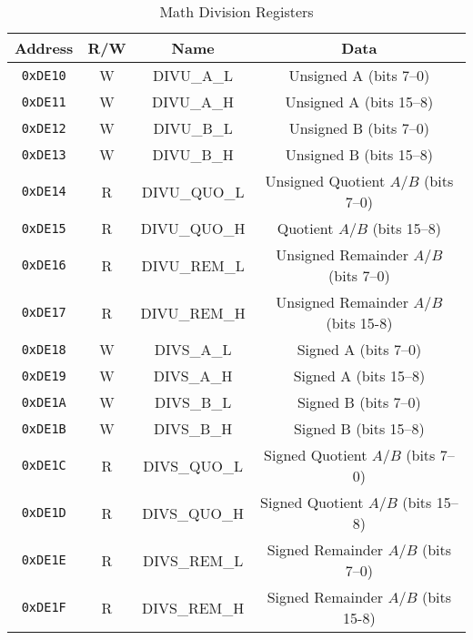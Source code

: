 \begin{table}[ht]
    \begin{center}
        \begin{tabular}{|c|c|c|c|} \hline
            Address & R/W & Name & Data \\\hline\hline
            \verb+0xDE10+ & W & DIVU\_A\_L & Unsigned A (bits 7--0) \\ \hline
            \verb+0xDE11+ & W & DIVU\_A\_H & Unsigned A (bits 15--8) \\ \hline
            \verb+0xDE12+ & W & DIVU\_B\_L & Unsigned B (bits 7--0) \\ \hline
            \verb+0xDE13+ & W & DIVU\_B\_H & Unsigned B (bits 15--8) \\ \hline
            \verb+0xDE14+ & R & DIVU\_QUO\_L & Unsigned Quotient $A / B$ (bits 7--0) \\ \hline
            \verb+0xDE15+ & R & DIVU\_QUO\_H & Quotient $A / B$ (bits 15--8) \\ \hline
            \verb+0xDE16+ & R & DIVU\_REM\_L & Unsigned Remainder $A / B$ (bits 7--0) \\ \hline
            \verb+0xDE17+ & R & DIVU\_REM\_H & Unsigned Remainder $A / B$ (bits 15-8) \\ \hline\hline

            \verb+0xDE18+ & W & DIVS\_A\_L & Signed A (bits 7--0) \\ \hline
            \verb+0xDE19+ & W & DIVS\_A\_H & Signed A (bits 15--8) \\ \hline
            \verb+0xDE1A+ & W & DIVS\_B\_L & Signed B (bits 7--0) \\ \hline
            \verb+0xDE1B+ & W & DIVS\_B\_H & Signed B (bits 15--8) \\ \hline
            \verb+0xDE1C+ & R & DIVS\_QUO\_L & Signed Quotient $A / B$ (bits 7--0) \\ \hline
            \verb+0xDE1D+ & R & DIVS\_QUO\_H & Signed Quotient $A / B$ (bits 15--8) \\ \hline
            \verb+0xDE1E+ & R & DIVS\_REM\_L & Signed Remainder $A / B$ (bits 7--0) \\ \hline
            \verb+0xDE1F+ & R & DIVS\_REM\_H & Signed Remainder $A / B$ (bits 15-8) \\ \hline
        \end{tabular}
    \end{center}
    \caption{Math Division Registers}
    \label{tab:math_div_reg}
\end{table}